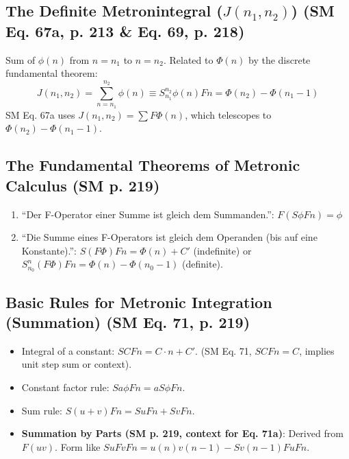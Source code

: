 \documentclass[
    12pt,              %
    a4paper,           %
    headings=normal,   %
    twoside=true,      %
    BCOR=8mm,          %
]{scrbook}
\newcommand{\q}[1]{\enquote{#1}}
\newcommand{\metronintegral}{S}
\newcommand{\metronenziffer}{n}
\begin{document}
\subsection{The Definite Metronintegral (\(J(n_1, n_2)\)) (SM Eq. 67a, p. 213 \& Eq. 69, p. 218)}
\label{sec:ch10_3_3_definite_metronintegral}
Sum of \(\phi(n)\) from \(n=n_1\) to \(n=n_2\). Related to \(\Phi(n)\) by the discrete fundamental theorem:
\begin{equation} \label{eq:original_definite_metronintegral} %
J(n_1, n_2) = \sum_{\metronenziffer=n_1}^{n_2} \phi(\metronenziffer) \equiv \metronintegral_{n_1}^{n_2} \phi(\metronenziffer)F\metronenziffer = \Phi(n_2) - \Phi(n_1 - 1)
\end{equation}
SM Eq. 67a uses \(J(n_1, n_2) = \sum F\Phi(n)\), which telescopes to \(\Phi(n_2) - \Phi(n_1-1)\).

\subsection{The Fundamental Theorems of Metronic Calculus (SM p. 219)}
\label{sec:ch10_3_4_fundamental_theorems}
\begin{enumerate}[label=\arabic*.]
    \item \q{Der F-Operator einer Summe ist gleich dem Summanden.}: \( F(S\phi Fn) = \phi \)
    \item \q{Die Summe eines F-Operators ist gleich dem Operanden (bis auf eine Konstante).}: \( S(F\Phi)Fn = \Phi(n) + C' \) (indefinite) or \(S_{n_0}^{n} (F\Phi) Fn = \Phi(n) - \Phi(n_0 - 1)\) (definite).
\end{enumerate}

\subsection{Basic Rules for Metronic Integration (Summation) (SM Eq. 71, p. 219)}
\label{sec:ch10_3_5_integration_rules}
\begin{itemize}
    \item   Integral of a constant: \(SCFn = C \cdot n + C'\). (SM Eq. 71, \(SCFn = C\), implies unit step sum or context).
    \item   Constant factor rule: \(Sa\phi Fn = a S\phi Fn\).
    \item   Sum rule: \(S(u+v)Fn = SuFn + SvFn\).
    \item   \textbf{Summation by Parts (SM p. 219, context for Eq. 71a)}: Derived from \(F(uv)\). Form like \(S u Fv Fn = u(n)v(n-1) - S v(n-1) Fu Fn\).
\end{itemize}
\end{document}
